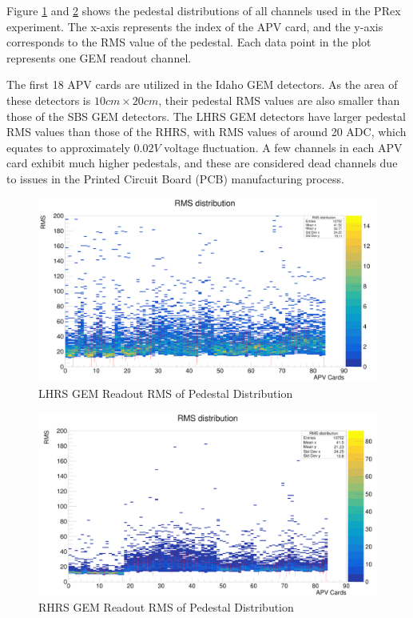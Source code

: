 Figure \ref{fig:lhrs_pedestal_distribution} and \ref{fig:rhrs_pedestal_distribution} shows the pedestal distributions of all  channels used in the PRex experiment. The x-axis represents the index of the APV card, and the y-axis corresponds to the RMS value of the pedestal. Each data point in the plot represents one GEM readout channel.

The first 18 APV cards are utilized in the Idaho GEM detectors. As the area of these detectors is $10 cm \times 20 cm$, their pedestal RMS values are also smaller than those of the SBS GEM detectors. The LHRS GEM detectors have larger pedestal RMS values than those of the RHRS, with RMS values of around 20 ADC, which equates to approximately $0.02 V$ voltage fluctuation. A few channels in each APV card exhibit much higher pedestals, and these are considered dead channels due to issues in the Printed Circuit Board (PCB) manufacturing process.

\begin{figure}[!htbp]
    \centering
    \includegraphics[width=\textwidth]{images/chap5/LHRS_pedestal.png}
    \caption{LHRS GEM Readout RMS of Pedestal Distribution}
    \label{fig:lhrs_pedestal_distribution}
\end{figure}

\begin{figure}[!htbp]
    \centering
    \includegraphics[width=\textwidth]{images/chap5/rhrs_pedestal.png}
    \caption{RHRS GEM Readout RMS of Pedestal Distribution}
    \label{fig:rhrs_pedestal_distribution}
\end{figure}

